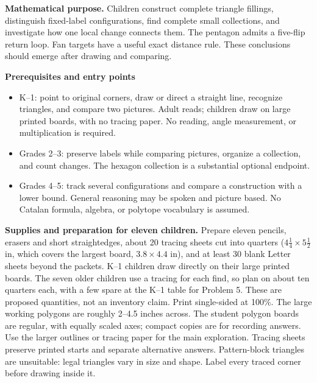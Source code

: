 \documentclass[11pt,letterpaper]{article}
\begin{document}
\textbf{Mathematical purpose.} Children construct complete triangle fillings, distinguish fixed-label configurations, find complete small collections, and investigate how one local change connects them. The pentagon admits a five-flip return loop. Fan targets have a useful exact distance rule. These conclusions should emerge after drawing and comparing.

\textbf{Prerequisites and entry points}
\begin{itemize}
\item K--1: point to original corners, draw or direct a straight line, recognize triangles, and compare two pictures. Adult reads; children draw on large printed boards, with no tracing paper. No reading, angle measurement, or multiplication is required.
\item Grades 2--3: preserve labels while comparing pictures, organize a collection, and count changes. The hexagon collection is a substantial optional endpoint.
\item Grades 4--5: track several configurations and compare a construction with a lower bound. General reasoning may be spoken and picture based. No Catalan formula, algebra, or polytope vocabulary is assumed.
\end{itemize}
\textbf{Supplies and preparation for eleven children.} Prepare eleven pencils, erasers and short straightedges, about 20 tracing sheets cut into quarters ($4\tfrac14\times5\tfrac12$ in, which covers the largest board, $3.8\times4.4$ in), and at least 30 blank Letter sheets beyond the packets. K--1 children draw directly on their large printed boards. The seven older children use a tracing for each find, so plan on about ten quarters each, with a few spare at the K--1 table for Problem 5. These are proposed quantities, not an inventory claim. Print single-sided at 100\%. The large working polygons are roughly 2--4.5 inches across. The student polygon boards are regular, with equally scaled axes; compact copies are for recording answers. Use the larger outlines or tracing paper for the main exploration. Tracing sheets preserve printed starts and separate alternative answers. Pattern-block triangles are unsuitable: legal triangles vary in size and shape. Label every traced corner before drawing inside it.
\end{document}
